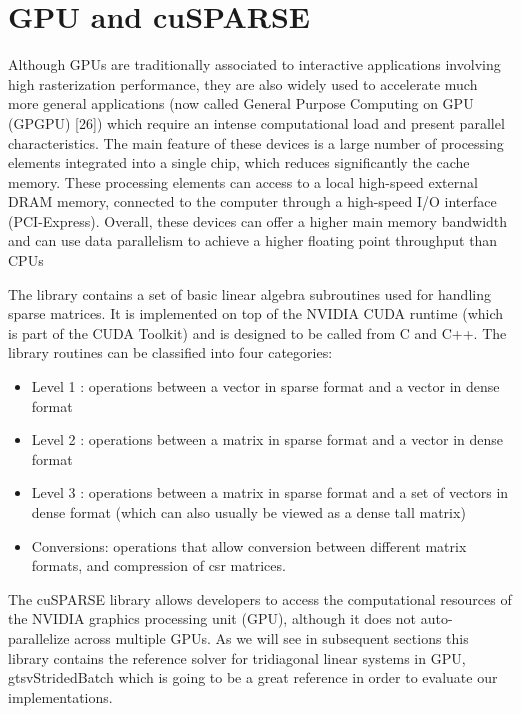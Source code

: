 \section{GPU and cuSPARSE}

Although GPUs are traditionally associated to interactive applications involving high
rasterization performance, they are also widely used to accelerate much more general
applications (now called General Purpose Computing on GPU (GPGPU) [26]) which
require an intense computational load and present parallel characteristics. The main
feature of these devices is a large number of processing elements integrated into a single chip, which reduces significantly the cache memory. These processing elements
can access to a local high-speed external DRAM memory, connected to the computer
through a high-speed I/O interface (PCI-Express). Overall, these devices can offer a
higher main memory bandwidth and can use data parallelism to achieve a higher floating point throughput than CPUs

The \cite{cuSPARSE} library contains a set of basic linear algebra subroutines used for
handling sparse matrices. It is implemented on top of the NVIDIA CUDA runtime (which is part of the CUDA Toolkit) and is designed to be called from C and C++.
The library routines can be classified into four categories:

\begin{itemize}
    \item Level 1 : operations between a vector in sparse format and a vector in dense
    format
    \item Level 2 : operations between a matrix in sparse format and a vector in dense
    format
    \item Level 3 : operations between a matrix in sparse format and a set of vectors in
    dense format (which can also usually be viewed as a dense tall matrix)
    \item Conversions: operations that allow conversion between different matrix formats,
    and compression of csr matrices.
\end{itemize}

The cuSPARSE library allows developers to access the computational resources of the
NVIDIA graphics processing unit (GPU), although it does not auto-parallelize across
multiple GPUs. As we will see in subsequent sections this library contains the reference
solver for tridiagonal linear systems in GPU, gtsvStridedBatch which is going to be a
great reference in order to evaluate our implementations.


